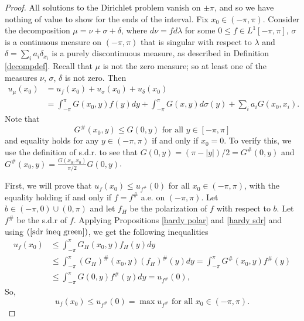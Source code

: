 \documentclass[11pt]{amsart}
\numberwithin{equation}{section}
\begin{document}
\begin{proof}
All solutions to the Dirichlet problem vanish on \(\pm\pi\), and so we have nothing of value to show for the ends of the interval. Fix \(x_0\in(-\pi,\pi)\). Consider the decomposition \(\mu=\nu+\sigma+\delta\), where \(d\nu=fd\lambda\) for some \(0\leq f\in L^1[-\pi,\pi]\), \(\sigma\) is a continuous measure on \((-\pi,\pi)\) that is singular with respect to \(\lambda\) and \(\delta=\sum_i a_i \delta_{x_i}\) is a purely discontinuous measure, as described in Definition \ref{decompdef}. Recall that \(\mu\) is not the zero measure; so at least one of the measures
\(\nu\), \(\sigma\), \(\delta\) is not zero. Then
\begin{align*}
u_{\mu}(x_0)&=u_f(x_0)+u_\sigma(x_0)+u_\delta(x_0)\\
&=\int_{-\pi}^\pi G(x_0,y)f(y)dy+\int_{-\pi}^\pi G(x,y)d\sigma(y)+\sum_{i}a_i G(x_0,x_i).
\end{align*}
Note that 
\begin{equation}\label{sdr ineq green} 
G^\#(x_0,y)\leq G(0,y) \text{ for all }y\in[-\pi,\pi]
\end{equation}
and equality holds for any \(y\in(-\pi,\pi)\) if and only if \(x_0=0\). To verify this, we use the definition of s.d.r. to see that \(G(0,y)=(\pi-|y|)/2=G^\#(0,y)\) and \(\displaystyle G^\#(x_0,y)=\frac{G(x_0,x_0)}{\pi/2}G(0,y)\).
\par First, we will prove that \(u_f(x_0)\leq u_{f^\#}(0)\) for all \(x_0\in(-\pi,\pi)\), with the equality holding if and only if \(f=f^\#\) a.e. on \((-\pi,\pi)\). Let \(b\in(-\pi,0)\cup(0,\pi)\) and let \(f_H\) be the polarization of \(f\) with respect to \(b\). Let \(f^\#\) be the s.d.r of \(f\). Applying Propositions \ref{hardy polar} and \ref{hardy sdr} and using \((\ref{sdr ineq green})\), we get the following inequalities
\begin{align}\displaystyle
\label{efarmogh hardy polar}    u_f(x_0)&\leq\int_{-\pi}^\pi G_H(x_0,y)f_H(y)dy\\
\label{efarmogh hardy sdr}    &\leq\int_{-\pi}^\pi (G_H)^\#(x_0,y)(f_H)^\#(y)dy=\int_{-\pi}^\pi G^\#(x_0,y)f^\#(y)\\
\label{max Green austhro}    &\leq\int_{-\pi}^\pi G(0,y)f^\#(y)dy=u_{f^\#}(0),
\end{align}
So, 
\begin{equation}\label{max of u f}
u_f(x_0)\leq u_{f^\#}(0)=\max u_{f^\#}\text{ for all }x_0\in(-\pi,\pi).
\end{equation}

\end{proof}
\end{document}
